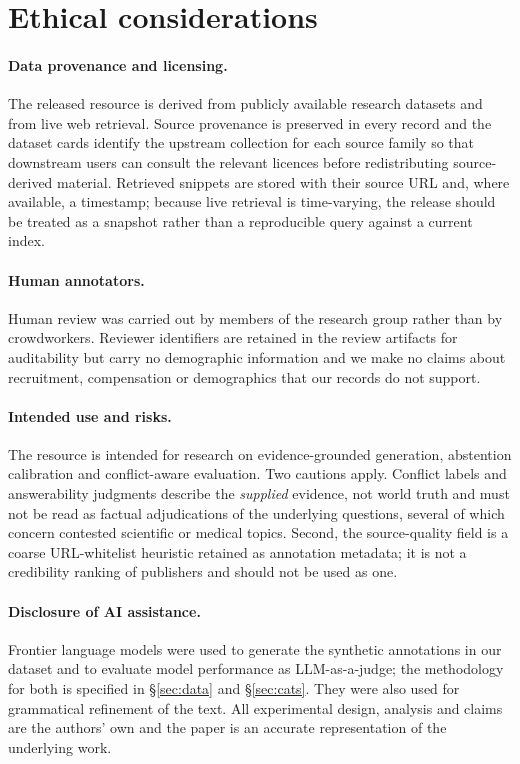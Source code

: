 \section*{Ethical considerations}

\paragraph{Data provenance and licensing.} The released resource is derived from
publicly available research datasets and from live web retrieval. Source
provenance is preserved in every record and the dataset cards identify the
upstream collection for each source family so that downstream users can consult
the relevant licences before redistributing source-derived material. Retrieved
snippets are stored with their source URL and, where available, a timestamp;
because live retrieval is time-varying, the release should be treated as a
snapshot rather than a reproducible query against a current index.

\paragraph{Human annotators.} Human review was carried out by members of the
research group rather than by crowdworkers. Reviewer identifiers are retained in
the review artifacts for auditability but carry no demographic information and
we make no claims about recruitment, compensation or demographics that our
records do not support.

\paragraph{Intended use and risks.} The resource is intended for research on
evidence-grounded generation, abstention calibration and conflict-aware
evaluation. Two cautions apply. Conflict labels and answerability judgments
describe the \emph{supplied} evidence, not world truth and must not be read as
factual adjudications of the underlying questions, several of which concern
contested scientific or medical topics. Second, the source-quality field is a
coarse URL-whitelist heuristic retained as annotation metadata; it is not a
credibility ranking of publishers and should not be used as one.

\paragraph{Disclosure of AI assistance.} Frontier language models were used to
generate the synthetic annotations in our dataset and to evaluate model
performance as LLM-as-a-judge; the methodology for both is specified in
\S\ref{sec:data} and \S\ref{sec:cats}. They were also used for grammatical
refinement of the text. All experimental design, analysis and claims are the
authors' own and the paper is an accurate representation of the underlying
work.
